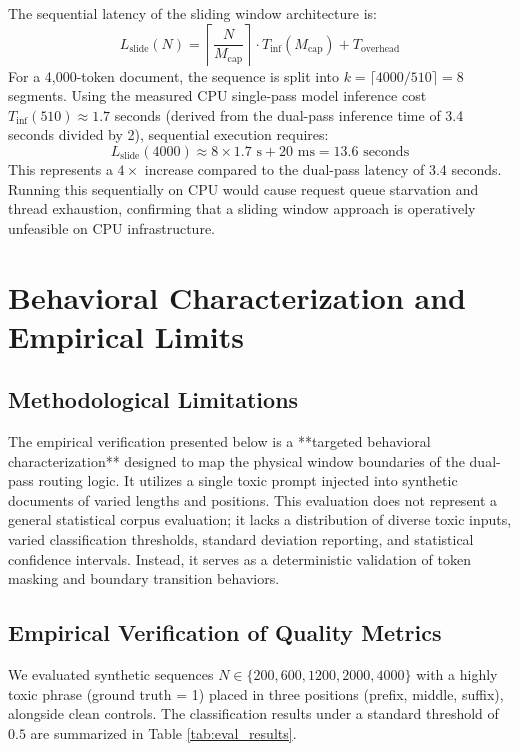 \documentclass[10pt]{article}
\begin{document}
The sequential latency of the sliding window architecture is:
\begin{equation}
L_{\text{slide}}(N) = \left\lceil \frac{N}{M_{\text{cap}}} \right\rceil \cdot T_{\text{inf}}(M_{\text{cap}}) + T_{\text{overhead}}
\end{equation}
For a 4,000-token document, the sequence is split into $k = \lceil 4000/510 \rceil = 8$ segments.
Using the measured CPU single-pass model inference cost $T_{\text{inf}}(510) \approx 1.7$ seconds (derived from the dual-pass inference time of 3.4 seconds divided by 2), sequential execution requires:
\begin{equation}
L_{\text{slide}}(4000) \approx 8 \times 1.7\text{ s} + 20\text{ ms} = 13.6\text{ seconds}
\end{equation}
This represents a $4\times$ increase compared to the dual-pass latency of 3.4 seconds. Running this sequentially on CPU would cause request queue starvation and thread exhaustion, confirming that a sliding window approach is operatively unfeasible on CPU infrastructure.

\section{Behavioral Characterization and Empirical Limits}

\subsection{Methodological Limitations}
The empirical verification presented below is a **targeted behavioral characterization** designed to map the physical window boundaries of the dual-pass routing logic. It utilizes a single toxic prompt injected into synthetic documents of varied lengths and positions. This evaluation does not represent a general statistical corpus evaluation; it lacks a distribution of diverse toxic inputs, varied classification thresholds, standard deviation reporting, and statistical confidence intervals. Instead, it serves as a deterministic validation of token masking and boundary transition behaviors.

\subsection{Empirical Verification of Quality Metrics}
We evaluated synthetic sequences $N \in \{200, 600, 1200, 2000, 4000\}$ with a highly toxic phrase (ground truth = 1) placed in three positions (prefix, middle, suffix), alongside clean controls. The classification results under a standard threshold of $0.5$ are summarized in Table \ref{tab:eval_results}.
\end{document}
